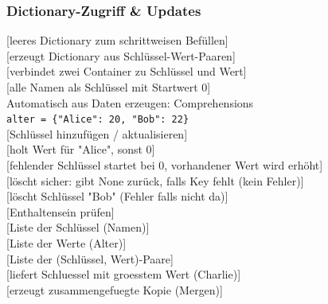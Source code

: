 \subsubsection{Dictionary-Zugriff \& Updates}\label{sec:01-dictionary-operationen}
\begin{contentbox}
[leeres Dictionary zum schrittweisen Befüllen]\\
[erzeugt Dictionary aus Schlüssel-Wert-Paaren]\\
[verbindet zwei Container zu Schlüssel und Wert]\\
[alle Namen als Schlüssel mit Startwert 0]\\
Automatisch aus Daten erzeugen: Comprehensions \\
\texttt{alter = \{"Alice": 20, "Bob": 22\}}\\
[Schlüssel hinzufügen / aktualisieren]\\
[holt Wert für "Alice", sonst 0]\\
[fehlender Schlüssel startet bei 0, vorhandener Wert wird erhöht]\\
[löscht sicher: gibt None zurück, falls Key fehlt (kein Fehler)]\\
[löscht Schlüssel "Bob" (Fehler falls nicht da)]\\
[Enthaltensein prüfen]\\
[Liste der Schlüssel (Namen)]\\
[Liste der Werte (Alter)]\\
[Liste der (Schlüssel, Wert)-Paare]\\
[liefert Schluessel mit groesstem Wert (Charlie)]\\
[erzeugt zusammengefuegte Kopie (Mergen)]
\end{contentbox}

